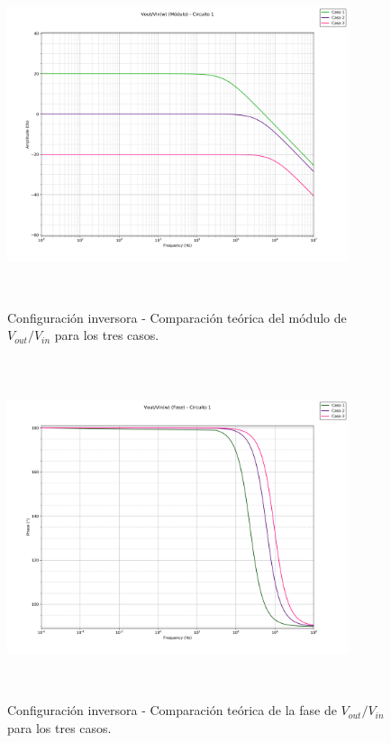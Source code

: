 \begin{figure}[H] %
	\centering
	\includegraphics[width=10cm,height=10cm,keepaspectratio]{../EJ1/00GRAFICOS/teoricos/circ1voviw.png}
	\caption{Configuración inversora - Comparaci\'on te\'orica del m\'odulo de $V_{out}/V_{in}$ para los tres casos.}
	\label{c1voviTeoMod}
\end{figure}

\begin{figure}[H] %
	\centering
	\includegraphics[width=10cm,height=10cm,keepaspectratio]{../EJ1/00GRAFICOS/teoricos/circ1vovifasew.png}
	\caption{Configuración inversora - Comparaci\'on te\'orica de la fase de $V_{out}/V_{in}$ para los tres casos.}
	\label{c1voviTeoPh}
\end{figure}

